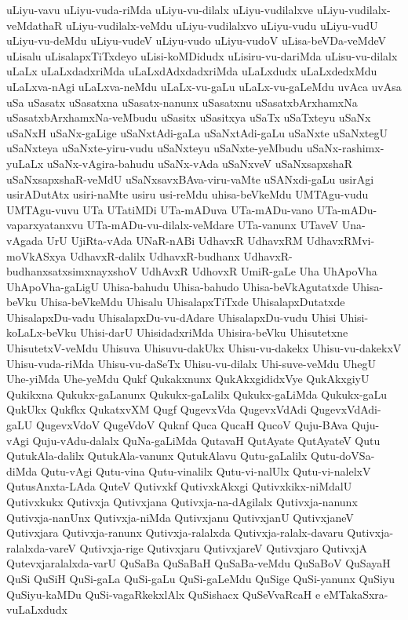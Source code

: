 {uLiyu-vavu
uLiyu-vuda-riMda
uLiyu-vu-dilalx
uLiyu-vudilalxve
uLiyu-vudilalx-veMdathaR
uLiyu-vudilalx-veMdu
uLiyu-vudilalxvo
uLiyu-vudu
uLiyu-vudU
uLiyu-vu-deMdu
uLiyu-vudeV
uLiyu-vudo
uLiyu-vudoV
uLisa-beVDa-veMdeV
uLisalu
uLisalapxTiTxdeyo
uLisi-koMDidudx
uLisiru-vu-dariMda
uLisu-vu-dilalx
uLaLx
uLaLxdadxriMda
uLaLxdAdxdadxriMda
uLaLxdudx
uLaLxdedxMdu
uLaLxva-nAgi
uLaLxva-neMdu
uLaLx-vu-gaLu
uLaLx-vu-gaLeMdu
uvAca
uvAsa
uSa
uSasatx
uSasatxna
uSasatx-nanunx
uSasatxnu
uSasatxbArxhamxNa
uSasatxbArxhamxNa-veMbudu
uSasitx
uSasitxya
uSaTx
uSaTxteyu
uSaNx
uSaNxH
uSaNx-gaLige
uSaNxtAdi-gaLa
uSaNxtAdi-gaLu
uSaNxte
uSaNxtegU
uSaNxteya
uSaNxte-yiru-vudu
uSaNxteyu
uSaNxte-yeMbudu
uSaNx-rashimx-yuLaLx
uSaNx-vAgira-bahudu
uSaNx-vAda
uSaNxveV
uSaNxsapxshaR
uSaNxsapxshaR-veMdU
uSaNxsavxBAva-viru-vaMte
uSANxdi-gaLu
usirAgi
usirADutAtx
usiri-naMte
usiru
usi-reMdu
uhisa-beVkeMdu
UMTAgu-vudu
UMTAgu-vuvu
UTa
UTatiMDi
UTa-mADuva
UTa-mADu-vano
UTa-mADu-vaparxyatanxvu
UTa-mADu-vu-dilalx-veMdare
UTa-vanunx
UTaveV
Una-vAgada
UrU
UjiRta-vAda
UNaR-nABi
UdhavxR
UdhavxRM
UdhavxRMvi-moVkASxya
UdhavxR-dalilx
UdhavxR-budhanx
UdhavxR-budhanxsatxsimxnayxshoV
UdhAvxR
UdhovxR
UmiR-gaLe
Uha
UhApoVha
UhApoVha-gaLigU
Uhisa-bahudu
Uhisa-bahudo
Uhisa-beVkAgutatxde
Uhisa-beVku
Uhisa-beVkeMdu
Uhisalu
UhisalapxTiTxde
UhisalapxDutatxde
UhisalapxDu-vadu
UhisalapxDu-vu-dAdare
UhisalapxDu-vudu
Uhisi
Uhisi-koLaLx-beVku
Uhisi-darU
UhisidadxriMda
Uhisira-beVku
Uhisutetxne
UhisutetxV-veMdu
Uhisuva
Uhisuvu-dakUkx
Uhisu-vu-dakekx
Uhisu-vu-dakekxV
Uhisu-vuda-riMda
Uhisu-vu-daSeTx
Uhisu-vu-dilalx
Uhi-suve-veMdu
UhegU
Uhe-yiMda
Uhe-yeMdu
Qukf
Qukakxnunx
QukAkxgididxVye
QukAkxgiyU
Qukikxna
Qukukx-gaLanunx
Qukukx-gaLalilx
Qukukx-gaLiMda
Qukukx-gaLu
QukUkx
Qukfkx
QukatxvXM
Qugf
QugevxVda
QugevxVdAdi
QugevxVdAdi-gaLU
QugevxVdoV
QugeVdoV
Quknf
Quca
QucaH
QucoV
Quju-BAva
Quju-vAgi
Quju-vAdu-dalalx
QuNa-gaLiMda
QutavaH
QutAyate
QutAyateV
Qutu
QutukAla-dalilx
QutukAla-vanunx
QutukAlavu
Qutu-gaLalilx
Qutu-doVSa-diMda
Qutu-vAgi
Qutu-vina
Qutu-vinalilx
Qutu-vi-nalUlx
Qutu-vi-nalelxV
QutusAnxta-LAda
QuteV
Qutivxkf
QutivxkAkxgi
Qutivxkikx-niMdalU
Qutivxkukx
Qutivxja
Qutivxjana
Qutivxja-na-dAgilalx
Qutivxja-nanunx
Qutivxja-nanUnx
Qutivxja-niMda
Qutivxjanu
QutivxjanU
QutivxjaneV
Qutivxjara
Qutivxja-ranunx
Qutivxja-ralalxda
Qutivxja-ralalx-davaru
Qutivxja-ralalxda-vareV
Qutivxja-rige
Qutivxjaru
QutivxjareV
Qutivxjaro
QutivxjA
Qutevxjaralalxda-varU
QuSaBa
QuSaBaH
QuSaBa-veMdu
QuSaBoV
QuSayaH
QuSi
QuSiH
QuSi-gaLa
QuSi-gaLu
QuSi-gaLeMdu
QuSige
QuSi-yanunx
QuSiyu
QuSiyu-kaMDu
QuSi-vagaRkekxlAlx
QuSishacx
QuSeVvaRcaH
e
eMTakaSxra-vuLaLxdudx
}
